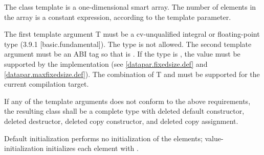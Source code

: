 

\pnum The class template \datapar{} is a one-dimensional smart array.
The number of elements in the array is a constant expression, according to the  template parameter.

\pnum\label{datapar.type requirements}%
The first template argument \type T must be a cv-unqualified integral or floating-point type (3.9.1 [basic.fundamental]).
The type \bool is not allowed.
The second template argument  must be an ABI tag so that  is \true.
If the  type is \fixedsizeN, the value  must be supported by the implementation (see \ref{datapar.fixedsize.def} and \ref{datapar.maxfixedsize.def}).
The combination of \type T and  must be supported for the current compilation target.


\pnum\label{datapar.deleted}%
If any of the template arguments does not conform to the above requirements, the resulting class shall be a complete type with deleted default constructor, deleted destructor, deleted copy constructor, and deleted copy assignment.

\pnum Default initialization performs no initialization of the elements; value-initialization initializes each element with .

